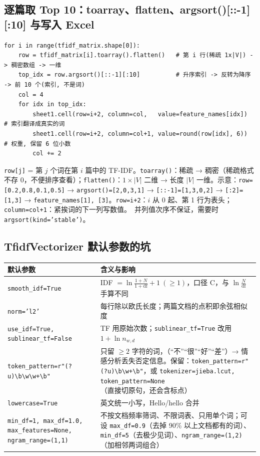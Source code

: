 \subsection{逐篇取 Top 10：toarray、flatten、argsort()[::-1][:10] 与写入 Excel}
\begin{lstlisting}[style=pyD08a]
for i in range(tfidf_matrix.shape[0]):
    row = tfidf_matrix[i].toarray().flatten()   # 第 i 行(稀疏 1x|V|) -> 稠密数组 -> 一维
    top_idx = row.argsort()[::-1][:10]          # 升序索引 -> 反转为降序 -> 前 10 个(索引, 不是词)
    col = 4
    for idx in top_idx:
        sheet1.cell(row=i+2, column=col,   value=feature_names[idx])   # 索引翻译成真实的词
        sheet1.cell(row=i+2, column=col+1, value=round(row[idx], 6))   # 权重, 保留 6 位小数
        col += 2
\end{lstlisting}
\texttt{row[j]} = 第 $j$ 个词在第 $i$ 篇中的 TF-IDF。\texttt{toarray()}：稀疏 → 稠密（稀疏格式不存 0，不便排序查看）；\texttt{flatten()}：$1\times|V|$ 二维 → 长度 $|V|$ 一维。示意：\texttt{row=[0.2,0.8,0.1,0.5]} → \texttt{argsort()=[2,0,3,1]} → \texttt{[::-1]=[1,3,0,2]} → \texttt{[:2]=[1,3]} → \texttt{feature\_names[1], [3]}。\texttt{row=i+2}：$i$ 从 0 起、第 1 行为表头；\texttt{column=col+1}：紧挨词的下一列写数值。\tagext\ 并列值次序不保证，需要时 \texttt{argsort(kind='stable')}。

\subsection{TfidfVectorizer 默认参数的坑 \texorpdfstring{\tagext}{}}
\begin{tabD08a}
\begin{tabularx}{\linewidth}{@{}p{5.2cm}L@{}}
\toprule
默认参数 & 含义与影响 \\
\midrule
\texttt{smooth\_idf=True} & IDF $=\ln\frac{1+N}{1+\mathrm{df}}+1\ (\ge1)$，口径 C，与 $\ln\frac N{\mathrm{df}}$ 手算不同 \\
\texttt{norm='l2'} & 每行除以欧氏长度；两篇文档的点积即余弦相似度 \\
\texttt{use\_idf=True, sublinear\_tf=False} & TF 用原始次数；\texttt{sublinear\_tf=True} 改用 $1+\ln n_{w,d}$ \\
\texttt{token\_pattern=r"(?u)\textbackslash b\textbackslash w\textbackslash w+\textbackslash b"} & 只留 $\ge2$ 字符的词，（“不”“很”“好”“差”）→ 情感分析丢失否定信息。保留：\texttt{token\_pattern=r"(?u)\textbackslash b\textbackslash w+\textbackslash b"}，或 \texttt{tokenizer=jieba.lcut, token\_pattern=None}（直接切原句，还会含标点）\\
\texttt{lowercase=True} & 英文统一小写，Hello/hello 合并 \\
\texttt{min\_df=1, max\_df=1.0, max\_features=None, ngram\_range=(1,1)} & 不按文档频率筛词、不限词表、只用单个词；可设 \texttt{max\_df=0.9}（去掉 90\% 以上文档都有的词）、\texttt{min\_df=5}（去极少见词）、\texttt{ngram\_range=(1,2)}（加相邻两词组合）\\
\bottomrule
\end{tabularx}
\end{tabD08a}

